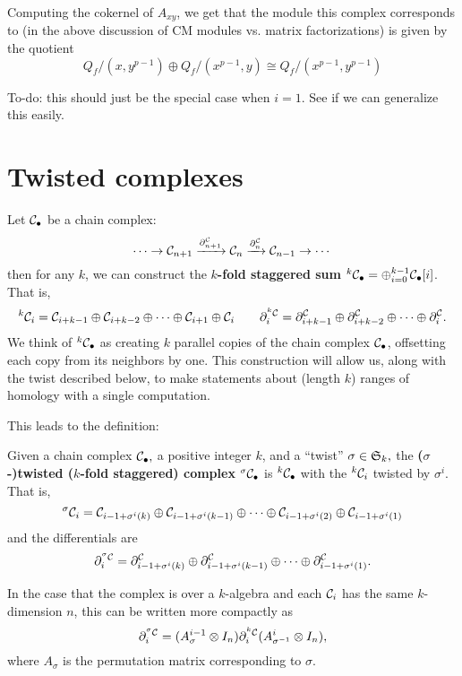 \documentclass[12pt]{article}
\begin{document}
Computing the cokernel of $A_{xy}$, we get that the module this complex corresponds to (in the above discussion of CM modules vs. matrix factorizations) is given by the quotient
\[Q_f/(x,y^{p-1})\oplus Q_f/(x^{p-1},y)\cong Q_f/(x^{p-1},y^{p-1})\]

{\color{red}To-do: this should just be the special case when $i=1$. See if we can generalize this easily.}

\section{Twisted complexes}
Let $\mathcal{C}_\bullet$ be a chain complex:
\[\cdots\to\mathcal{C}_{n+1}\xrightarrow{\partial^{\mathcal{C}}_{n+1}}\mathcal{C}_n\xrightarrow{\partial^{\mathcal{C}}_n}\mathcal{C}_{n-1}\to\cdots\]
then for any $k$, we can construct the \textbf{$k$-fold staggered sum} $^k\mathcal{C}_\bullet=\oplus_{i=0}^{k-1}\mathcal{C}_\bullet[i]$. That is,
\[^k\mathcal{C}_i = \mathcal{C}_{i+k-1}\oplus\mathcal{C}_{i+k-2}\oplus\cdots\oplus \mathcal{C}_{i+1}\oplus \mathcal{C}_i\qquad \partial^{^k\mathcal{C}}_{i}=\partial^{\mathcal{C}}_{i+k-1} \oplus\partial^{\mathcal{C}}_{i+k-2} \oplus\cdots\oplus\partial^{\mathcal{C}}_i.\]
We think of $^k\mathcal{C}_\bullet$ as creating $k$ parallel copies of the chain complex $\mathcal{C}_\bullet$, offsetting each copy from its neighbors by one. This construction will allow us, along with the twist described below, to make statements about (length $k$) ranges of homology with a single computation.

This leads to the definition:
\begin{defn}\label{def:twisted-complex}
    Given a chain complex $\mathcal{C}_\bullet,$ a positive integer $k$, and a ``twist'' $\sigma\in\mathfrak{S}_k,$ the \textbf{($\sigma$-)twisted ($k$-fold staggered) complex} $^\sigma\mathcal{C}_\bullet$ is $^k\mathcal{C}_\bullet$ with the $^k\mathcal{C}_i$ twisted by $\sigma^i$. That is,
    \begin{equation}\label{eqn:twisted-complex}
        ^\sigma\mathcal{C}_i=\mathcal{C}_{i-1+\sigma^i(k)}\oplus\mathcal{C}_{i-1+\sigma^i(k-1)}\oplus\cdots\oplus \mathcal{C}_{i-1+\sigma^i(2)}\oplus \mathcal{C}_{i-1+\sigma^i(1)}
    \end{equation}
    and the differentials are
    \[\partial^{^\sigma\mathcal{C}}_i=\partial^{\mathcal{C}}_{i-1+\sigma^i(k)}\oplus\partial^{\mathcal{C}}_{i-1+\sigma^i(k-1)}\oplus\cdots\oplus \partial^{\mathcal{C}}_{i-1+\sigma^i(1)}.\]
\end{defn}
\begin{rmk}
    In the case that the complex is over a $k$-algebra and each $\mathcal{C}_i$ has the same $k$-dimension $n$, this can be written more compactly as
    \[\partial^{^\sigma\mathcal{C}}_i=(A_{\sigma}^{i-1}\otimes I_n)\partial_i^{^k\mathcal{C}}(A_{\sigma^{-1}}^i\otimes I_n),\]
    where $A_\sigma$ is the permutation matrix corresponding to $\sigma$.
\end{rmk}
\end{document}

